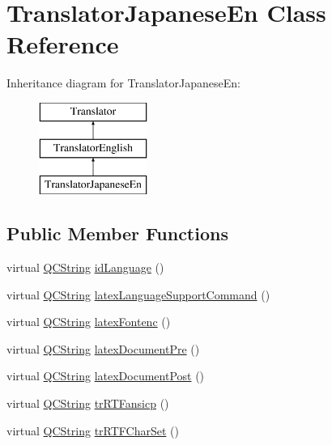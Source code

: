 \hypertarget{class_translator_japanese_en}{}\section{Translator\+Japanese\+En Class Reference}
\label{class_translator_japanese_en}
Inheritance diagram for Translator\+Japanese\+En\+:\begin{figure}[H]
\begin{center}
\leavevmode
\includegraphics[height=3.000000cm]{class_translator_japanese_en}
\end{center}
\end{figure}
\subsection*{Public Member Functions}
\begin{DoxyCompactItemize}
\item 
virtual \mbox{\hyperlink{class_q_c_string}{Q\+C\+String}} \mbox{\hyperlink{class_translator_japanese_en_a920e7fc0a427b655de47f4085d331099}{id\+Language}} ()
\item 
virtual \mbox{\hyperlink{class_q_c_string}{Q\+C\+String}} \mbox{\hyperlink{class_translator_japanese_en_a82a0008e9f9183374a7581124053ca4f}{latex\+Language\+Support\+Command}} ()
\item 
virtual \mbox{\hyperlink{class_q_c_string}{Q\+C\+String}} \mbox{\hyperlink{class_translator_japanese_en_a591b9073a3c3b05b85bc2dbb5f0f2436}{latex\+Fontenc}} ()
\item 
virtual \mbox{\hyperlink{class_q_c_string}{Q\+C\+String}} \mbox{\hyperlink{class_translator_japanese_en_a33a1f40ad9680e0277b0d47bb40af96e}{latex\+Document\+Pre}} ()
\item 
virtual \mbox{\hyperlink{class_q_c_string}{Q\+C\+String}} \mbox{\hyperlink{class_translator_japanese_en_a08a448436b8cc3dd28d328ab7145112f}{latex\+Document\+Post}} ()
\item 
virtual \mbox{\hyperlink{class_q_c_string}{Q\+C\+String}} \mbox{\hyperlink{class_translator_japanese_en_a4da6df8b58582eb97ffef9f75e070c0f}{tr\+R\+T\+Fansicp}} ()
\item 
virtual \mbox{\hyperlink{class_q_c_string}{Q\+C\+String}} \mbox{\hyperlink{class_translator_japanese_en_aff3e71dc3a1d71f056fea3299c8a427e}{tr\+R\+T\+F\+Char\+Set}} ()
\end{DoxyCompactItemize}


